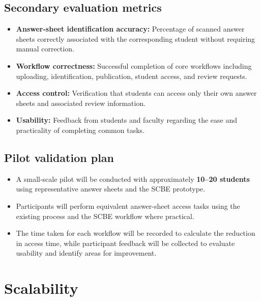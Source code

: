 \documentclass[11pt,a4paper]{article}
\begin{document}
\subsection{Secondary evaluation metrics}
\begin{itemize}[leftmargin=0.7cm]
    \item \textbf{Answer-sheet identification accuracy:} Percentage of scanned answer sheets correctly associated with the corresponding student without requiring manual correction.
    \item \textbf{Workflow correctness:} Successful completion of core workflows including uploading, identification, publication, student access, and review requests.
    \item \textbf{Access control:} Verification that students can access only their own answer sheets and associated review information.
    \item \textbf{Usability:} Feedback from students and faculty regarding the ease and practicality of completing common tasks.
\end{itemize}

\subsection{Pilot validation plan}
\begin{itemize}[leftmargin=0.7cm]
    \item A small-scale pilot will be conducted with approximately \textbf{10--20 students} using representative answer sheets and the SCBE prototype.
    \item Participants will perform equivalent answer-sheet access tasks using the existing process and the SCBE workflow where practical.
    \item The time taken for each workflow will be recorded to calculate the reduction in access time, while participant feedback will be collected to evaluate usability and identify areas for improvement.
\end{itemize}

\section{Scalability}
\end{document}
